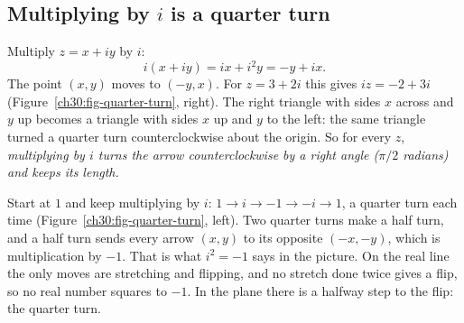 \subsection{Multiplying by \texorpdfstring{$i$}{i} is a quarter turn}

Multiply $z = x + iy$ by $i$:
\[
  i(x + iy) = ix + i^2 y = -y + ix.
\]
The point $(x, y)$ moves to $(-y, x)$. For $z = 3 + 2i$ this gives $iz = -2 + 3i$ (Figure~\ref{ch30:fig-quarter-turn}, right). The right triangle with sides $x$ across and $y$ up becomes a triangle with sides $x$ up and $y$ to the left: the same triangle turned a quarter turn counterclockwise about the origin. So for every $z$, \emph{multiplying by $i$ turns the arrow counterclockwise by a right angle ($\pi/2$ radians) and keeps its length.}

Start at $1$ and keep multiplying by $i$: $1 \to i \to -1 \to -i \to 1$, a quarter turn each time (Figure~\ref{ch30:fig-quarter-turn}, left). Two quarter turns make a half turn, and a half turn sends every arrow $(x,y)$ to its opposite $(-x,-y)$, which is multiplication by $-1$. That is what $i^2 = -1$ says in the picture. On the real line the only moves are stretching and flipping, and no stretch done twice gives a flip, so no real number squares to $-1$. In the plane there is a halfway step to the flip: the quarter turn.

